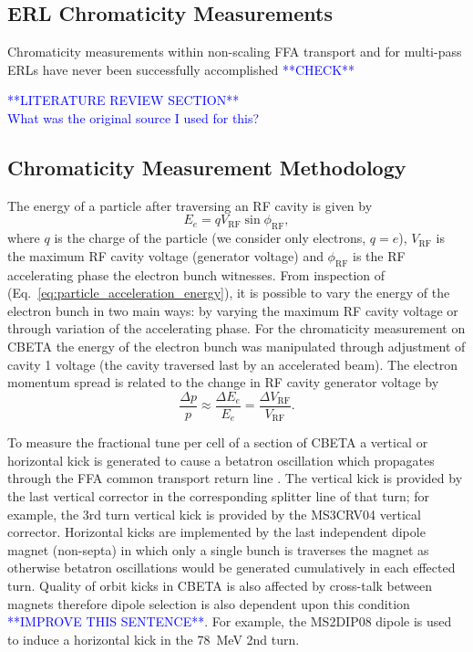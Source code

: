 \documentclass[../main.tex]{subfiles}
\begin{document}
\subsection{ERL Chromaticity Measurements}
\label{sec:ERL_chromaticity_measurements}

Chromaticity measurements within non-scaling FFA transport and for multi-pass ERLs have never been successfully accomplished \textcolor{blue}{**CHECK**}

\textcolor{blue}{**LITERATURE REVIEW SECTION** \\ What was the original source I used for this? }

\subsection{Chromaticity Measurement Methodology}
\label{sec:chromaticity_measurement_methodology}

The energy of a particle after traversing an RF cavity is given by
\begin{equation}
E_{e} = qV_{\mathrm{RF}}\sin\phi_{\mathrm{RF}},
\label{eq:particle_acceleration_energy}
\end{equation}
where $q$ is the charge of the particle (we consider only electrons, $q=e$), $V_{\mathrm{RF}}$ is the maximum RF cavity voltage (generator voltage) and $\phi_{\mathrm{RF}}$ is the RF accelerating phase the electron bunch witnesses. From inspection of (Eq.~\ref{eq:particle_acceleration_energy}), it is possible to vary the energy of the electron bunch in two main ways: by varying the maximum RF cavity voltage or through variation of the accelerating phase. For the chromaticity measurement on CBETA the energy of the electron bunch was manipulated through adjustment of cavity 1 voltage (the cavity traversed last by an accelerated beam). The electron momentum spread is related to the change in RF cavity generator voltage by
\begin{equation}
\frac{\Delta p}{p}\approx \frac{\Delta E_{e}}{E_{e}} = \frac{\Delta V_{\mathrm{RF}}}{V_{\mathrm{RF}}}.    
\end{equation}

To measure the fractional tune per cell of a section of CBETA a vertical or horizontal kick is generated to cause a betatron oscillation which propagates through the FFA common transport return line \cite{gulliford2021measurement}. The vertical kick is provided by the last vertical corrector in the corresponding splitter line of that turn; for example, the 3rd turn vertical kick is provided by the MS3CRV04 vertical corrector. Horizontal kicks are implemented by the last independent dipole magnet (non-septa) in which only a single bunch is traverses the magnet as otherwise betatron oscillations would be generated cumulatively in each effected turn. Quality of orbit kicks in CBETA is also affected by cross-talk between magnets therefore dipole selection is also dependent upon this condition \textcolor{blue}{**IMPROVE THIS SENTENCE**}. For example, the MS2DIP08 dipole is used to induce a horizontal kick in the 78~\si{\mega\electronvolt} 2nd turn.
\end{document}
